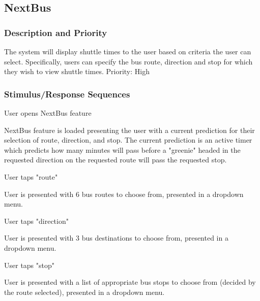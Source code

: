 \documentclass[pdftex,12pt,letter]{article}
\begin{document}
\subsection{NextBus}
\subsubsection{Description and Priority}
The system will display shuttle times to the user based on criteria the user can select. Specifically, users can specify the bus route, direction and stop for which they wish to view shuttle times. Priority: High
\subsubsection{Stimulus/Response Sequences}
\begin{description}\itemsep1pt
\item[Stimulus:] User opens NextBus feature
\item[Response:] NextBus feature is loaded presenting the user with a current prediction for their selection of route, direction, and stop. The current prediction is an active timer which predicts how many minutes will pass before a "greenie" headed in the requested direction on the requested route will pass the requested stop.
\item[Stimulus:] User taps "route"
\item[Response:] User is presented with 6 bus routes to choose from, presented in a dropdown menu.
\item[Stimulus:] User taps "direction"
\item[Response:] User is presented with 3 bus destinations to choose from, presented in a dropdown menu.
\item[Stimulus:] User taps "stop"
\item[Response:] User is presented with a list of appropriate bus stops to choose from (decided by the route selected), presented in a dropdown menu.
\end{description}
\newpage
\end{document}
